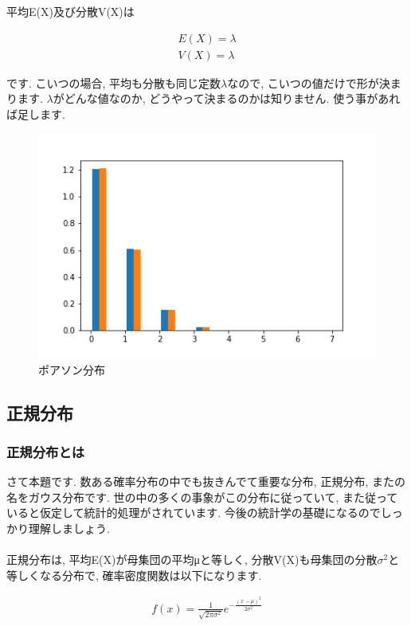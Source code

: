 \documentclass[11pt,a4paper]{jsarticle}                    %
\begin{document}
平均E(X)及び分散V(X)は

\begin{eqnarray}
E(X) = \lambda\\
V(X) = \lambda
\end{eqnarray}

です. こいつの場合, 平均も分散も同じ定数$\lambda$なので, こいつの値だけで形が決まります. $\lambda$がどんな値なのか, どうやって決まるのかは知りません. 使う事があれば足します.\\

\begin{figure}[H]
\label{im:poisson}
  \centering
  \includegraphics[width=120mm,bb=0 0 432 288]{figures/poisson.png}
  \caption{ポアソン分布}
\end{figure}

\subsection{正規分布}
\subsubsection{正規分布とは}
さて本題です. 数ある確率分布の中でも抜きんでて重要な分布, 正規分布, またの名をガウス分布です. 世の中の多くの事象がこの分布に従っていて, また従っていると仮定して統計的処理がされています. 今後の統計学の基礎になるのでしっかり理解しましょう.\\
\\
正規分布は, 平均E(X)が母集団の平均μと等しく, 分散V(X)も母集団の分散$\sigma ^2$と等しくなる分布で, 確率密度関数は以下になります.

\begin{eqnarray}
\label{eq:normal}
f(x) = \frac{1}{\sqrt{2\pi\sigma^2}}e^{-\frac{(x-\mu)^2}{2\sigma^2}}
\end{eqnarray}
\end{document}
